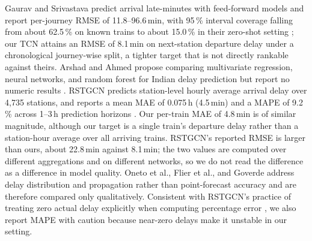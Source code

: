 \documentclass[a4paper,fleqn]{cas-dc}
\begin{document}
Gaurav and Srivastava predict arrival late-minutes with feed-forward models
and report per-journey RMSE of 11.8--96.6\,min, with 95\,\% interval coverage
falling from about 62.5\,\% on known trains to about 15.0\,\% in their
zero-shot setting \citep{gaurav2018zeroshot}; our TCN attains an RMSE of
8.1\,min on next-station departure delay under a chronological journey-wise
split, a tighter target that is not directly rankable against theirs. Arshad
and Ahmed propose comparing multivariate regression, neural networks, and
random forest for Indian delay prediction but report no numeric results
\citep{arshad2019prediction}. RSTGCN predicts station-level hourly average
arrival delay over 4{,}735 stations, and reports a mean MAE of 0.075\,h
(4.5\,min) and a MAPE of 9.2\,\% across 1--3\,h prediction horizons
\citep{chowdhury2025rstgcn}. Our per-train MAE
of 4.8\,min is of similar magnitude, although our target is a single train's
departure delay rather than a station-hour average over all arriving trains.
RSTGCN's reported RMSE is larger than ours, about 22.8\,min against
8.1\,min; the two values are computed over different aggregations and on
different networks, so we do not read the difference as a difference in model
quality. Oneto et al., Flier et al., and Goverde
\citep{oneto2018train,flier2009delay,goverde2010railway} address delay
distribution and propagation rather than point-forecast accuracy and are
therefore compared only qualitatively. Consistent with RSTGCN's practice of
treating zero actual delay explicitly when computing percentage error
\citep{chowdhury2025rstgcn}, we also report MAPE with caution because
near-zero delays make it unstable in our setting.
\end{document}
